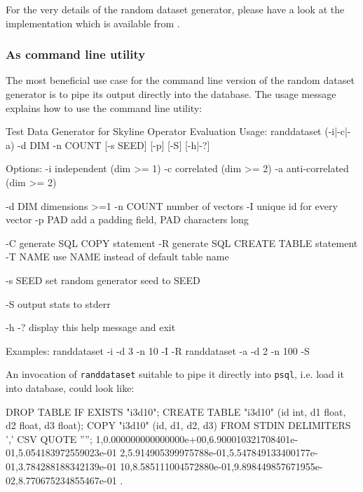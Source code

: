 For the very details of the random dataset generator, please have a
look at the implementation which is available from \citep{Eder2007a}.

\subsubsection{As command line utility}

The most beneficial use case for the command line version of the
random dataset generator is to pipe its output directly into the
database. The usage message explains how to use the command line
utility:

\begin{interactive}
Test Data Generator for Skyline Operator Evaluation
Usage: randdataset (-i|-c|-a) -d DIM -n COUNT [-s SEED] [-p] [-S] [-h|-?]

Options:
       -i       independent (dim >= 1)
       -c       correlated (dim >= 2)
       -a       anti-correlated (dim >= 2)

       -d DIM   dimensions >=1
       -n COUNT number of vectors
       -I       unique id for every vector
       -p PAD   add a padding field, PAD characters long

       -C       generate SQL COPY statement
       -R       generate SQL CREATE TABLE statement
       -T NAME  use NAME instead of default table name

       -s SEED  set random generator seed to SEED

       -S       output stats to stderr

       -h -?    display this help message and exit

Examples:
       randdataset -i -d 3 -n 10 -I -R
       randdataset -a -d 2 -n 100 -S
\end{interactive}

An invocation of \texttt{randdataset} suitable to pipe it directly
into \texttt{psql}, i.e. load it into database, could look like:

\begin{interactive}
DROP TABLE IF EXISTS "i3d10";
CREATE TABLE "i3d10" (id int, d1 float, d2 float, d3 float);
COPY "i3d10" (id, d1, d2, d3) FROM STDIN DELIMITERS ',' CSV QUOTE '''';
1,0.000000000000000e+00,6.900010321708401e-01,5.054183972559023e-01
2,5.914905399975788e-01,5.547849133400177e-01,3.784288188342139e-01
\ellipsis{}
10,8.585111004572880e-01,9.898449857671955e-02,8.770675234855467e-01
\ttbackslash.
\end{interactive}

